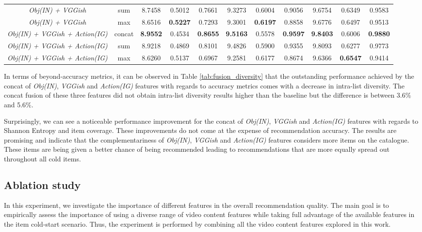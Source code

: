 \documentclass[review]{elsarticle}
\begin{document}
\begin{table}[H]
\begin{adjustbox}{width=\columnwidth}
\begin{tabular}{|c|c c c c c c c c c c|}
\textit{Obj(IN) + VGGish} 	& sum &8.7458	&0.5012	&0.7661	&9.3273	&0.6004	&0.9056	&9.6754	&0.6349	&0.9583	\\ 
\textit{Obj(IN) + VGGish} 	& max &8.6516	&\textbf{0.5227}	&0.7293	&9.3001	&\textbf{0.6197}	&0.8858	&9.6776	&0.6497	&0.9513	\\ 
\textit{Obj(IN) + VGGish + Action(IG)} 	& concat &\textbf{8.9552}	&0.4534	&\textbf{0.8655}	&\textbf{9.5163}	&0.5578	&\textbf{0.9597}	&\textbf{9.8403}	&0.6006	&\textbf{0.9880}	\\ 
\textit{Obj(IN) + VGGish + Action(IG)} & sum 	&8.9218	&0.4869	&0.8101	&9.4826	&0.5900	&0.9355	&9.8093	&0.6277	&0.9773	\\ 
\textit{Obj(IN) + VGGish + Action(IG)} 	& max &8.6260	&0.5137	&0.6967	&9.2581	&0.6177	&0.8674	&9.6366	&\textbf{0.6547}	&0.9414	\\ \hline
    \end{tabular}
    \end{adjustbox}
\end{table}

In terms of beyond-accuracy metrics, it can be observed in Table \ref{tab:fusion_diversity} that the outstanding performance achieved by the concat of \textit{Obj(IN)}, \textit{VGGish} and \textit{Action(IG)} features with regards to accuracy metrics comes with a decrease in intra-list diversity. The concat fusion of these three features did not obtain intra-list diversity results higher than the baseline but the difference is between 3.6\% and 5.6\%. 

Surprisingly, we can see a noticeable performance improvement for the concat of \textit{Obj(IN)}, \textit{VGGish} and \textit{Action(IG)} features with regards to Shannon Entropy and item coverage. These improvements do not come at the expense of recommendation accuracy. The results are promising and indicate that the complementariness of \textit{Obj(IN)}, \textit{VGGish} and \textit{Action(IG)} features considers more items on the catalogue. These items are being given a better chance of being recommended leading to recommendations that are more equally spread out throughout all cold items. 






\subsection{Ablation study}
In this experiment, we investigate the importance of different features in the overall recommendation quality. The main goal is to empirically assess the importance of using a diverse range of video content features while taking full advantage of the available features in the item cold-start scenario. Thus, the experiment is performed by combining all the video content features explored in this work.
\end{document}
